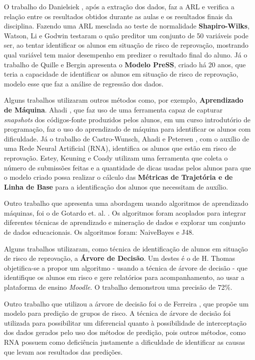 \documentclass[12pt]{article}
\begin{document}
O trabalho do Danielsiek \cite{Danielsiek2016}, após a extração dos dados, faz a ARL e verifica a relação entre os resultados obtidos durante as aulas e os resultados finais da disciplina. Fazendo uma ARL mesclada ao teste de normalidade \textbf{Shapiro-Wilks}, Watson, Li e Godwin \cite{Watson2014} testaram o quão preditor um conjunto de 50 variáveis pode ser, ao tentar identificar os alunos em situação de risco de reprovação, mostrando qual variável tem maior desempenho em predizer o resultado final do aluno. Já o trabalho de Quille e Bergin \cite{Quille2018} apresenta o \textbf{Modelo PreSS}, criado há 20 anos, que teria a capacidade de identificar os alunos em situação de risco de reprovação, modelo esse que faz a análise de regressão dos dados.

Alguns trabalhos utilizaram outros métodos como, por exemplo, \textbf{Aprendizado de Máquina}. Ahadi \cite{Ahadi2016a}, que faz uso de uma ferramenta capaz de capturar \textit{snapshots} dos códigos-fonte produzidos pelos alunos, em um curso introdutório de programação, faz o uso do aprendizado de máquina para identificar os alunos com dificuldade. Já o trabalho de Castro-Wunsch, Ahadi e Petersen \cite{Castro-Wunsch2017}, com o auxílio de uma Rede Neural Artificial (RNA), identifica os alunos que estão em risco de reprovação. Estey, Keuning e Coady \cite{Estey2017} utilizam uma ferramenta que coleta o número de submissões feitas e a quantidade de dicas usadas pelos alunos para que o modelo criado possa realizar o cálculo das \textbf{Métricas de Trajetória e de Linha de Base} para a identificação dos alunos que necessitam de auxílio.

Outro trabalho que apresenta uma abordagem usando algoritmos de aprendizado máquinas, foi o de Gotardo et. al. \cite{Gotardo2013}. Os algoritmos foram acoplados para integrar diferentes técnicas de aprendizado e mineração de dados e explorar um conjunto de dados educacionais. Os algoritmos foram: NaiveBayes e J48.

Alguns trabalhos utilizaram, como técnica de identificação de alunos em situação de risco de reprovação, a \textbf{Árvore de Decisão}. Um destes é o de
H. Thomas \cite{Thomas2010} objetifica-se a propor um algoritmo - usando a técnica de árvore de decisão - que identifique os alunos em risco e gere relatórios para acompanhamento, ao usar a plataforma de ensino \textit{Moodle}. O trabalho demonstrou uma precisão de 72\%.

Outro trabalho que utilizou a árvore de decisão foi o de Ferreira \cite{Ferreira2016}, que propõe um modelo para predição de grupos de risco. A técnica de árvore de decisão foi utilizada para possibilitar um diferencial quanto à possibilidade de interceptação dos dados gerados pelo uso dos métodos de predição, pois outros métodos, como RNA possuem como deficiência justamente a dificuldade de identificar as causas que levam aos resultados das predições.
\end{document}
